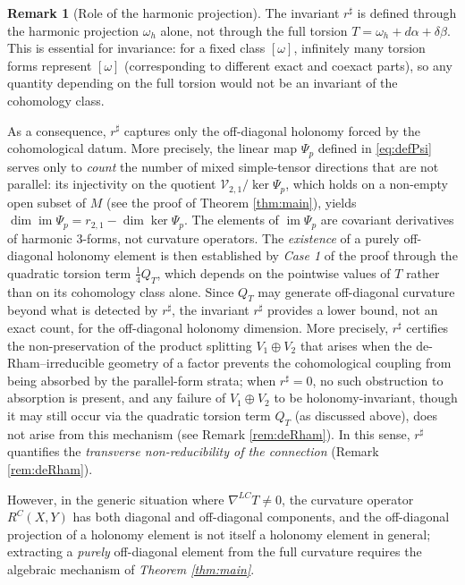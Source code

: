 \documentclass[11pt,reqno]{amsart}
\theoremstyle{plain}
\theoremstyle{definition}
\newtheorem{remark}[theorem]{Remark}
\numberwithin{equation}{section}
\begin{document}
\begin{remark}[Role of the harmonic projection]
\label{rem:harmonic}
The invariant $r^\sharp$ is defined through the harmonic projection $\omega_h$ alone, not through the full torsion 
$T = \omega_h + d\alpha + \delta\beta$.  This is essential for invariance: for a fixed class $[\omega]$, infinitely many torsion forms represent $[\omega]$ (corresponding to 
different exact and coexact parts), so any quantity depending on the full torsion would not be an invariant of the cohomology class.

As a consequence, $r^\sharp$ captures only the off-diagonal holonomy forced by the cohomological datum.
More precisely, the linear map $\Psi_p$ defined in \eqref{eq:defPsi} serves only to \emph{count} the number of mixed simple-tensor directions that are not parallel: its
injectivity on the quotient $\mathcal{V}_{2,1}/\ker\Psi_p$, which holds on a non-empty open subset of $M$ (see the proof of Theorem \ref{thm:main}), yields
$\dim\operatorname{im}\Psi_p = r_{2,1}-\dim\ker\Psi_p$. The elements of $\operatorname{im}\Psi_p$ are covariant derivatives of harmonic $3$-forms, not curvature operators.
The \emph{existence} of a purely off-diagonal holonomy element is then established by \emph{Case 1} of the proof through the quadratic torsion term $\tfrac{1}{4}Q_T$, which depends on the pointwise values of $T$ rather than on its cohomology class alone.
Since $Q_T$ may generate off-diagonal curvature beyond what is detected by $r^\sharp$, the invariant $r^\sharp$ provides a lower bound, not an exact count, for the off-diagonal holonomy dimension. More precisely, $r^\sharp$ certifies the non-preservation of the product splitting $V_1\oplus V_2$ that arises when the de-Rham--irreducible geometry of a factor prevents the cohomological coupling from being absorbed by the parallel-form strata; when $r^\sharp = 0$, no such obstruction to absorption is present, and any failure of $V_1\oplus V_2$ to be holonomy-invariant, though it may still occur via the quadratic torsion term $Q_T$ (as discussed above), does not arise from this mechanism (see Remark \ref{rem:deRham}). In this sense, $r^\sharp$ quantifies the \emph{transverse non-reducibility of the connection} (Remark \ref{rem:deRham}).

However, in the generic situation where $\nabla^{LC}T \neq 0$, the curvature operator $R^C(X,Y)$ has both diagonal and off-diagonal components, and the off-diagonal projection of a holonomy element is not itself a holonomy element in general; extracting a \emph{purely} off-diagonal element from the full curvature requires the algebraic mechanism of \emph{Theorem \ref{thm:main}}.
\end{remark}
\end{document}
